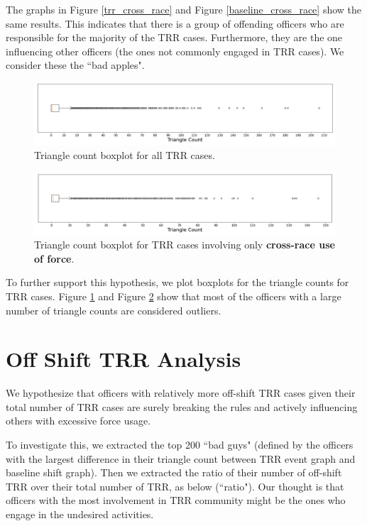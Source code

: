 \documentclass[10pt]{article}
\begin{document}
The graphs in Figure \ref{trr_cross_race} and Figure \ref{baseline_cross_race} show the same results. This indicates that there is a group of offending officers who are responsible for the majority of the TRR cases. Furthermore, they are the one influencing other officers (the ones not commonly engaged in TRR cases). We consider these the ``bad apples".

\begin{figure}[H]
\centering
\includegraphics[width=\textwidth]{triangle_count}
\caption{Triangle count boxplot for all TRR cases.}
\label{triangle_count}
\end{figure}

\begin{figure}[H]
\centering
\includegraphics[width=\textwidth]{triangle_count_cross_race}
\caption{Triangle count boxplot for TRR cases involving only \textbf{cross-race use of force}.}
\label{triangle_count_cross_race}
\end{figure}

To further support this hypothesis, we plot boxplots for the triangle counts for TRR cases. Figure \ref{triangle_count} and Figure \ref{triangle_count_cross_race} show that most of the officers with a large number of triangle counts are considered outliers.




\section{Off Shift TRR Analysis}


We hypothesize that officers with relatively more off-shift TRR cases given their total number of TRR cases are surely breaking the rules and actively influencing others with excessive force usage.

To investigate this, we extracted the top 200 ``bad guys" (defined by the officers with the largest difference in their triangle count between TRR event graph and baseline shift graph). Then we extracted the ratio of their number of off-shift TRR over their total number of TRR, as below (``ratio"). Our thought is that officers with the most involvement in TRR community might be the ones who engage in the undesired activities.
\end{document}
